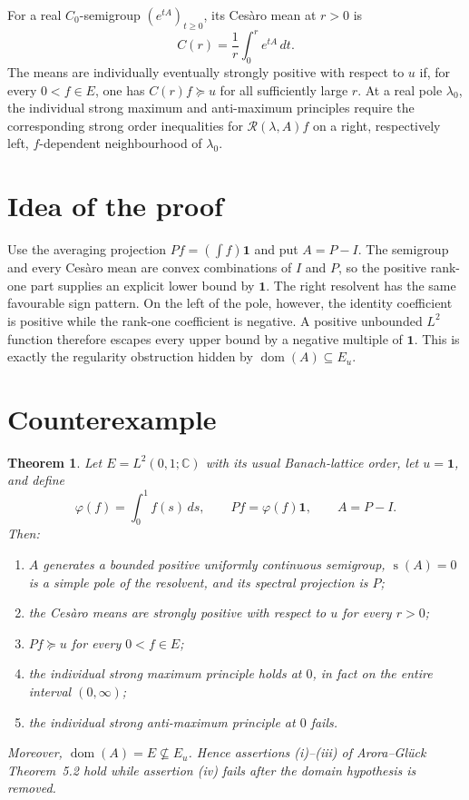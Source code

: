 \documentclass[11pt]{article}
\newtheorem{theorem}{Theorem}
\newcommand{\one}{\mathbf 1}
\newcommand{\R}{\mathcal R}
\newcommand{\dom}{\operatorname{dom}}
\newcommand{\spb}{\operatorname{s}}
\begin{document}
For a real $C_0$-semigroup $(e^{tA})_{t\geq0}$, its Ces\`aro mean at $r>0$ is
\[
 C(r)=\frac1r\int_0^r e^{tA}\,dt.
\]
The means are individually eventually strongly positive with respect to $u$
if, for every $0<f\in E$, one has $C(r)f\succeq u$ for all sufficiently
large $r$.  At a real pole $\lambda_0$, the individual strong maximum and
anti-maximum principles require the corresponding strong order inequalities
for $\R(\lambda,A)f$ on a right, respectively left, $f$-dependent
neighbourhood of $\lambda_0$.

\section{Idea of the proof}

Use the averaging projection $P f=(\int f)\one$ and put $A=P-I$.  The
semigroup and every Ces\`aro mean are convex combinations of $I$ and $P$,
so the positive rank-one part supplies an explicit lower bound by $\one$.
The right resolvent has the same favourable sign pattern.  On the left of the
pole, however, the identity coefficient is positive while the rank-one
coefficient is negative.  A positive unbounded $L^2$ function therefore
escapes every upper bound by a negative multiple of $\one$.  This is exactly
the regularity obstruction hidden by $\dom(A)\subseteq E_u$.

\section{Counterexample}

\begin{theorem}\label{thm:counterexample}
Let $E=L^2(0,1;\mathbb C)$ with its usual Banach-lattice order, let
$u=\one$, and define
\[
 \varphi(f)=\int_0^1 f(s)\,ds,\qquad Pf=\varphi(f)\one,\qquad A=P-I.
\]
Then:
\begin{enumerate}[label=\textup{(\roman*)}]
  \item $A$ generates a bounded positive uniformly continuous semigroup,
  $\spb(A)=0$ is a simple pole of the resolvent, and its spectral projection
  is $P$;
  \item the Ces\`aro means are strongly positive with respect to $u$ for
  every $r>0$;
  \item $Pf\succeq u$ for every $0<f\in E$;
  \item the individual strong maximum principle holds at $0$, in fact on
  the entire interval $(0,\infty)$;
  \item the individual strong anti-maximum principle at $0$ fails.
\end{enumerate}
Moreover, $\dom(A)=E\not\subseteq E_u$.  Hence assertions (i)--(iii) of
Arora--Gl\"uck Theorem~5.2 hold while assertion (iv) fails after the domain
hypothesis is removed.
\end{theorem}
\end{document}
